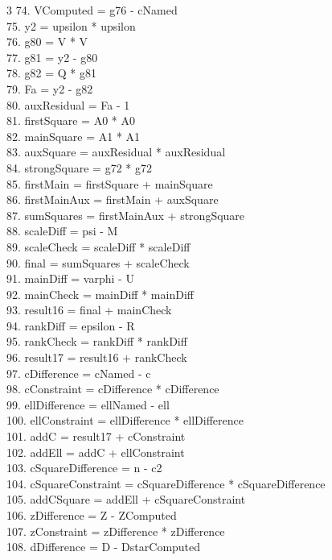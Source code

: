 \documentclass[10pt]{article}
\begin{document}
\begin{multicols}{3}
74. VComputed = g76 - cNamed\\
75. y2 = upsilon * upsilon\\
76. g80 = V * V\\
77. g81 = y2 - g80\\
78. g82 = Q * g81\\
79. Fa = y2 - g82\\
80. auxResidual = Fa - 1\\
81. firstSquare = A0 * A0\\
82. mainSquare = A1 * A1\\
83. auxSquare = auxResidual * auxResidual\\
84. strongSquare = g72 * g72\\
85. firstMain = firstSquare + mainSquare\\
86. firstMainAux = firstMain + auxSquare\\
87. sumSquares = firstMainAux + strongSquare\\
88. scaleDiff = psi - M\\
89. scaleCheck = scaleDiff * scaleDiff\\
90. final = sumSquares + scaleCheck\\
91. mainDiff = varphi - U\\
92. mainCheck = mainDiff * mainDiff\\
93. result16 = final + mainCheck\\
94. rankDiff = epsilon - R\\
95. rankCheck = rankDiff * rankDiff\\
96. result17 = result16 + rankCheck\\
97. cDifference = cNamed - c\\
98. cConstraint = cDifference * cDifference\\
99. ellDifference = ellNamed - ell\\
100. ellConstraint = ellDifference * ellDifference\\
101. addC = result17 + cConstraint\\
102. addEll = addC + ellConstraint\\
103. cSquareDifference = n - c2\\
104. cSquareConstraint = cSquareDifference * cSquareDifference\\
105. addCSquare = addEll + cSquareConstraint\\
106. zDifference = Z - ZComputed\\
107. zConstraint = zDifference * zDifference\\
108. dDifference = D - DstarComputed\\

\end{multicols}
\end{document}
